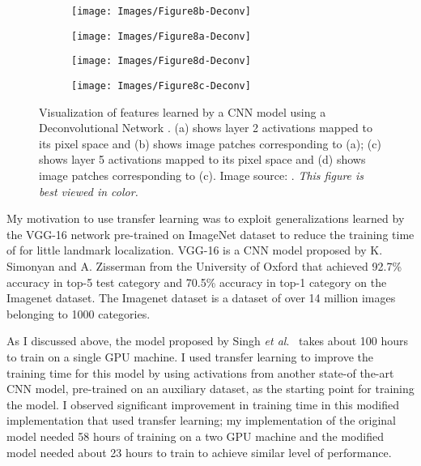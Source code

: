 \documentclass [11pt,letterpaper ,twoside ,openany ]{report}
\begin{document}
    \begin{figure}[t]
    \centering
        \begin{subfigure}[b]{0.23\linewidth}
            \centering
            \texttt{[image: Images/Figure8b-Deconv]}
            \caption{}
        \end{subfigure}    
        \begin{subfigure}[b]{0.23\linewidth}
            \centering
            \texttt{[image: Images/Figure8a-Deconv]}
            \caption{}
        \end{subfigure}
        \begin{subfigure}[b]{0.23\linewidth}
            \centering
            \texttt{[image: Images/Figure8d-Deconv]}
            \caption{}
        \end{subfigure}                
        \begin{subfigure}[b]{0.23\linewidth}
            \centering
            \texttt{[image: Images/Figure8c-Deconv]}
            \caption{}
        \end{subfigure}
        \caption{Visualization of features learned by a CNN model using a Deconvolutional Network \cite{zeiler2014visualizing}. (a) shows layer 2 activations mapped to its pixel space and (b) shows image patches corresponding to (a); (c) shows layer 5 activations mapped to its pixel space and (d) shows image patches corresponding to (c). Image source: \cite{zeiler2014visualizing}. \textit{This figure is best viewed in color.}}
        \label{fig:devonv}
    \end{figure}

    My motivation to use transfer learning was to exploit generalizations learned by the VGG-16 network \cite{simonyan2014very} pre-trained on ImageNet \cite{russakovsky2015imagenet} dataset to reduce the training time of for little landmark localization. VGG-16 \cite{simonyan2014very} is a CNN model proposed by K. Simonyan and A. Zisserman from the University of Oxford that achieved 92.7\% accuracy in top-5 test category and 70.5\% accuracy in top-1 category on the Imagenet dataset. The Imagenet dataset \cite{russakovsky2015imagenet} is a dataset of over 14 million images belonging to 1000 categories.

    As I discussed above, the model proposed by Singh \textit{et al}.\ \cite{Singh_2016_CVPR} takes about 100 hours to train on a single GPU machine. I used transfer learning to improve the training time for this model by using activations from another state-of the-art CNN model, pre-trained on an auxiliary dataset, as the starting point for training the model. I observed significant improvement in training time in this modified implementation that used transfer learning; my implementation of the original model needed 58 hours of training on a two GPU machine and the modified model needed about 23 hours to train to achieve similar level of performance.
\end{document}
